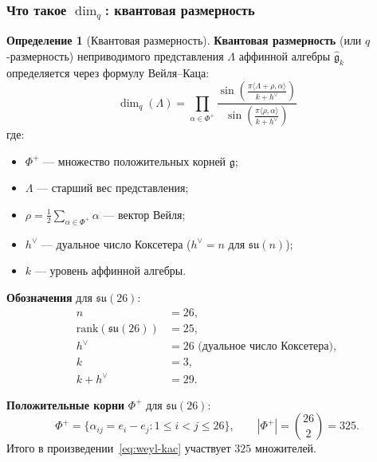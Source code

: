 \documentclass[11pt,a4paper]{article}
\theoremstyle{definition}
\newtheorem{definition}[theorem]{Определение}
\begin{document}
\subsubsection{Что такое \texorpdfstring{$\dim_q$}{\_q}: квантовая размерность}

\begin{definition}[Квантовая размерность]
\label{def:dim-q}
\textbf{Квантовая размерность} (или $q$-размерность) неприводимого
представления $\Lambda$ аффинной алгебры $\hat{\mathfrak{g}}_k$
определяется через формулу Вейля--Каца:
\begin{equation}
    \boxed{
    \dim_q(\Lambda) =
    \prod_{\alpha \in \Phi^+}
    \frac{\sin\left( \frac{\pi \langle \Lambda + \rho, \alpha \rangle}{k + h^\vee} \right)}
         {\sin\left( \frac{\pi \langle \rho, \alpha \rangle}{k + h^\vee} \right)}
    }
    \label{eq:weyl-kac}
\end{equation}
где:
\begin{itemize}
    \item $\Phi^+$ --- множество положительных корней $\mathfrak{g}$;
    \item $\Lambda$ --- старший вес представления;
    \item $\rho = \frac{1}{2} \sum_{\alpha \in \Phi^+} \alpha$ --- вектор Вейля;
    \item $h^\vee$ --- дуальное число Коксетера ($h^\vee = n$ для $\mathfrak{su}(n)$);
    \item $k$ --- уровень аффинной алгебры.
\end{itemize}
\end{definition}

\medskip\noindent
\textbf{Обозначения} для $\mathfrak{su}(26)$:
\begin{align}
    n &= 26, \\
    \text{rank}(\mathfrak{su}(26)) &= 25, \\
    h^\vee &= 26 \text{ (дуальное число Коксетера)}, \\
    k &= 3, \\
    k + h^\vee &= 29.
\end{align}

\medskip\noindent
\textbf{Положительные корни} $\Phi^+$ для $\mathfrak{su}(26)$:
\begin{equation}
    \Phi^+ = \{\alpha_{ij} = e_i - e_j : 1 \le i < j \le 26\},
    \qquad |\Phi^+| = \binom{26}{2} = 325.
\end{equation}
Итого в произведении~\eqref{eq:weyl-kac} участвует $325$ множителей.
\end{document}
